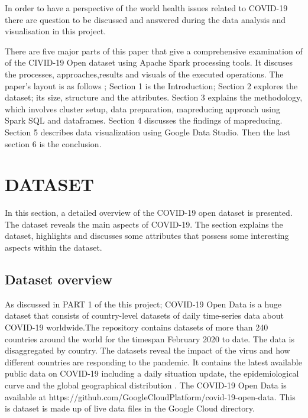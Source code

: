 \documentclass[12pt]{article}
\begin{document}
 In order to  have a perspective of the world health issues related to COVID-19 there are question to be discussed and answered during the data analysis and visualisation in this project.
 
There are five major parts of this paper that give a comprehensive examination of of the CIVID-19 Open dataset using Apache Spark processing tools. It discuses the processes, approaches,results and visuals of the executed operations. The paper's layout is as follows ; Section 1 is the Introduction; Section 2 explores the dataset; its size, structure and the attributes. Section 3 explains the methodology, which involves cluster setup, data preparation, mapreducing approach using Spark SQL and dataframes. Section 4 discusses the findings of mapreducing. Section 5 describes data visualization using Google Data Studio. Then the last section 6 is the conclusion.

\section{DATASET}
 In this  section, a detailed overview of the COVID-19 open dataset is presented. The dataset reveals the main aspects of COVID-19. The section explains the dataset, highlights and discusses some attributes that possess some interesting aspects  within the dataset.

\subsection{Dataset overview}

 As discussed in PART 1 of the this project;  COVID-19 Open Data is a huge dataset that consists of country-level datasets of daily time-series data about COVID-19 worldwide.The repository contains datasets of more than 240 countries around the world for the timespan February 2020 to date\cite{covid-19}. The data is disaggregated  by country. The datasets reveal the impact of the virus and how different countries are responding to the pandemic.  It contains the latest available public data on COVID-19 including a daily situation update, the epidemiological curve and the global geographical distribution \cite{covid-19}. The COVID-19 Open Data is available at https://github.com/GoogleCloudPlatform/covid-19-open-data. This is dataset is made up of live data files in the Google Cloud directory.
\end{document}
